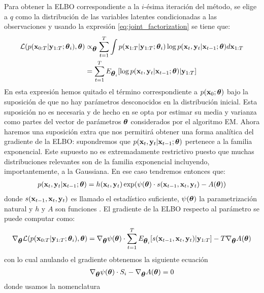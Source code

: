Para obtener la ELBO correspondiente a la $i$-ésima iteración del método, se elige a $q$ como la distribución de las variables latentes condicionadas a las observaciones y usando la expresión \ref{eq:joint_factorization} se tiene que:
\begin{align}
    \mathcal{L}(p(\mathbf{x}_{0:T} | \mathbf{y}_{1:T} ; \mbox{\boldmath$ \theta $}_i), \mbox{\boldmath$ \theta $}) &\propto_{\mbox{\boldmath$ \theta $}} \sum_{t=1}^T \int p(\mathbf{x}_{1:T} | \mathbf{y}_{1:T} ; \mbox{\boldmath$ \theta $}_i) \log p(\mathbf{x}_t, \mathbf{y}_t | \mathbf{x}_{t-1} ; \mbox{\boldmath$ \theta $}) d\mathbf{x}_{1:T} \\
    &= \sum_{t=1}^T E_{\mbox{\boldmath$ \theta $}_i} [\log p(\mathbf{x}_t, \mathbf{y}_t | \mathbf{x}_{t-1} ; \mbox{\boldmath$ \theta $}) | \mathbf{y}_{1:T}]
\end{align}
En esta expresión hemos quitado el término correspondiente a $p(\mathbf{x}_0 ; \mbox{\boldmath$ \theta $})$ bajo la suposición de que no hay parámetros desconocidos en la distribución inicial. Esta suposición no es necesaria y de hecho en \cite{Dreano2017} se opta por estimar su media y varianza como partes del vector de parámetros $\mbox{\boldmath$ \theta $}$ considerados por el algoritmo EM. Ahora haremos una suposición extra que nos permitirá obtener una forma analítica del gradiente de la ELBO: supondremos que $p(\mathbf{x}_t, \mathbf{y}_t | \mathbf{x}_{t-1} ; \mbox{\boldmath$ \theta $})$ pertenece a la familia exponencial. Este supuesto no es extremadamente restrictivo puesto que muchas distribuciones relevantes son de la familia exponencial incluyendo, importantemente, a la Gaussiana. En ese caso tendremos entonces que:
\begin{align*}
    p(\mathbf{x}_t, \mathbf{y}_t | \mathbf{x}_{t-1} ; \mbox{\boldmath$ \theta $}) = h(\mathbf{x}_t, \mathbf{y}_t) \exp(\psi(\mbox{\boldmath$ \theta $})\cdot s(\mathbf{x}_{t-1}, \mathbf{x}_t, \mathbf{y}_t) - A(\mbox{\boldmath$ \theta $}))
\end{align*}
donde $s(\mathbf{x}_{t-1}, \mathbf{x}_t, \mathbf{y}_t)$ es llamado el estadístico suficiente, $\psi(\mbox{\boldmath$ \theta $})$ la parametrización natural y $h$ y $A$ son funciones \citep{Wasserman2004}. El gradiente de la ELBO respecto al parámetro se puede computar como:
\begin{align}
    \nabla_{\mbox{\boldmath$ \theta $}} \mathcal{L}(p(\mathbf{x}_{0:T} | \mathbf{y}_{1:T} ; \mbox{\boldmath$ \theta $}_i), \mbox{\boldmath$ \theta $}) = \nabla_{\mbox{\boldmath$ \theta $}} \psi(\mbox{\boldmath$ \theta $}) \cdot \sum_{t=1}^T E_{\mbox{\boldmath$ \theta $}_i} [s(\mathbf{x}_{t-1}, \mathbf{x}_t, \mathbf{y}_t) | \mathbf{y}_{1:T}] - T\nabla_{\mbox{\boldmath$ \theta $}}A(\mbox{\boldmath$ \theta $})
\end{align}
con lo cual anulando el gradiente obtenemos la siguiente ecuación
\begin{align} \label{eq:null_elbo_grad}
    \nabla_{\mbox{\boldmath$ \theta $}} \psi(\mbox{\boldmath$ \theta $}) \cdot S_i - \nabla_{\mbox{\boldmath$ \theta $}}A(\mbox{\boldmath$ \theta $}) = 0
\end{align}
donde usamos la nomenclatura

